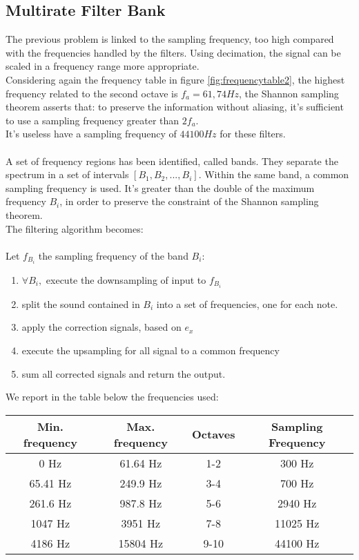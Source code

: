 \subsection{Multirate Filter Bank}
The previous problem is linked to the sampling frequency, too high compared with the frequencies handled by the filters. Using decimation, the signal can be scaled in a frequency range more appropriate.\\
Considering again the frequency table in figure \ref{fig:frequencytable2}, the highest frequency related to the second octave is $f_a=61,74Hz$, the Shannon sampling theorem asserts that: to preserve the information without aliasing, it's sufficient to use a sampling frequency greater than $2 f_a$.\\
It's useless have a sampling frequency of $44100Hz$ for these filters.\\\\
A set of frequency regions has been identified, called bands. They separate the spectrum in a set of intervals $[B_1,B_2, ..., B_i]$. Within the same band, a common sampling frequency is used. It's greater than the double of the maximum frequency $B_i$, in order to preserve the constraint of the Shannon sampling theorem.\\ 
The filtering algorithm becomes:\\\\
Let $f_{B_i}$ the sampling frequency of the band $B_i$:
\begin{enumerate}
	\item $\forall B_i,$ execute the downsampling of input to $f_{B_i}$
	\item split the sound contained in $B_i$ into a set of frequencies, one for each note.
	\item apply the correction signals, based on $e_x$
	\item execute the upsampling for all signal to a common frequency
	\item sum all corrected signals and return the output.
\end{enumerate}
We report in the table below the frequencies used:\\
\begin{tabular}{|c|c|c|c|}
\hline 
Min. frequency & Max. frequency & Octaves & Sampling Frequency \\ 
\hline 
0 Hz & 61.64 Hz & 1-2 & 300 Hz \\ 
\hline 
65.41 Hz & 249.9 Hz & 3-4 & 700 Hz \\ 
\hline 
261.6 Hz & 987.8 Hz & 5-6 & 2940 Hz \\ 
\hline 
1047 Hz & 3951 Hz & 7-8 & 11025 Hz \\ 
\hline 
4186 Hz & 15804 Hz & 9-10 & 44100 Hz \\ 
\hline 
\end{tabular} 
